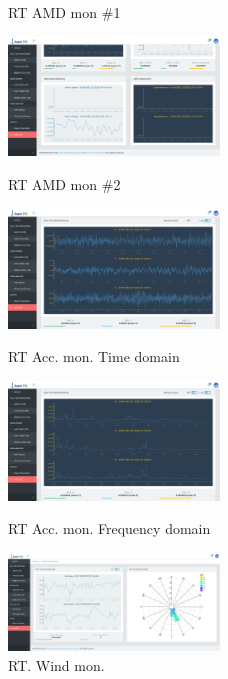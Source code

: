 \documentclass[10pt,a4paper,ragged2e]{altacv}
\begin{document}
\begin{fullwidth}
\begin{itemize}
\begin{figure}[!ht]
\begin{fullwidth}
{					      \caption*{RT AMD mon \#1}
				      }\qquad
				      \parbox{0.5\textwidth}{
					      \centering
					      \includegraphics[width=0.5\textwidth]{images/TM21 Vibration Controller Monitroing - amd2}
					      \caption*{RT AMD mon \#2}
				      }
				      \parbox{0.5\textwidth}{
					      \centering
					      \includegraphics[width=0.5\textwidth]{images/TM21 Vibration Controller Monitroing - time2}
					      \caption*{RT Acc. mon. Time domain}
				      }\qquad
				      \parbox{0.5\textwidth}{
					      \centering
					      \includegraphics[width=0.5\textwidth]{images/TM21 Vibration Controller Monitroing - fft2}
					      \caption*{RT Acc. mon. Frequency domain}
				      }\qquad
				      \parbox{0.5\textwidth}{
					      \centering
					      \includegraphics[width=0.5\textwidth]{images/TM21 Vibration Controller Monitroing - 220.149.227.106}
					      \caption*{RT. Wind mon.}
				      }
			      \end{fullwidth}
		      \end{figure}

\end{itemize}
\end{fullwidth}
\end{document}
